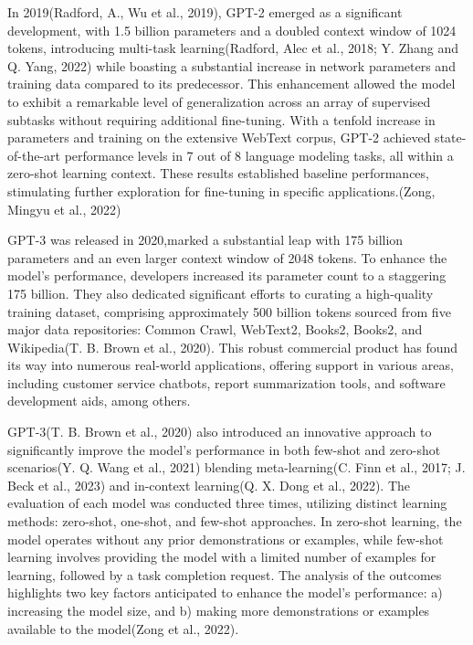 \documentclass[fleqn,10pt]{thescipub} %
\begin{document}
In 2019(Radford, A., Wu et al., 2019), GPT-2 emerged as a significant development, with 1.5 billion parameters and a doubled context window of 1024 tokens, introducing multi-task learning(Radford, Alec et al., 2018; Y. Zhang and Q. Yang, 2022) while boasting a substantial increase in network parameters and training data compared to its predecessor. This enhancement allowed the model to exhibit a remarkable level of generalization across an array of supervised subtasks without requiring additional fine-tuning. With a tenfold increase in parameters and training on the extensive WebText corpus, GPT-2 achieved state-of-the-art performance levels in 7 out of 8 language modeling tasks, all within a zero-shot learning context. These results established baseline performances, stimulating further exploration for fine-tuning in specific applications.(Zong, Mingyu et al., 2022)

GPT-3 was released in 2020,marked a substantial leap with 175 billion parameters and an even larger context window of 2048 tokens. To enhance the model's performance, developers increased its parameter count to a staggering 175 billion. They also dedicated significant efforts to curating a high-quality training dataset, comprising approximately 500 billion tokens sourced from five major data repositories: Common Crawl, WebText2, Books2, Books2, and Wikipedia(T. B. Brown et al., 2020). This robust commercial product has found its way into numerous real-world applications, offering support in various areas, including customer service chatbots, report summarization tools, and software development aids, among others.

GPT-3(T. B. Brown et al., 2020) also introduced an innovative approach to significantly improve the model's performance in both few-shot and zero-shot scenarios(Y. Q. Wang et al., 2021) blending meta-learning(C. Finn et al., 2017; J. Beck et al., 2023) and in-context learning(Q. X. Dong et al., 2022). The evaluation of each model was conducted three times, utilizing distinct learning methods: zero-shot, one-shot, and few-shot approaches. In zero-shot learning, the model operates without any prior demonstrations or examples, while few-shot learning involves providing the model with a limited number of examples for learning, followed by a task completion request. The analysis of the outcomes highlights two key factors anticipated to enhance the model's performance: a) increasing the model size, and b) making more demonstrations or examples available to the model(Zong et al., 2022).
\end{document}
